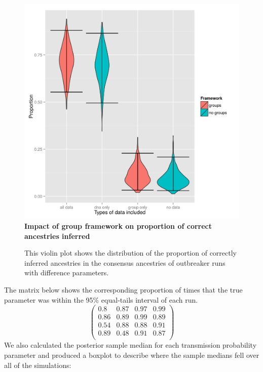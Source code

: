 \documentclass[11pt,a4paper]{report}
\begin{document}
\begin{figure}
\centering
\includegraphics[scale=0.6]{final.png}
\newline
{\bf Impact of group framework on proportion of correct ancestries inferred}
\caption{This violin plot shows the distribution of the proportion of correctly inferred ancestries in the consensus ancestries of outbreaker runs with difference parameters.}

\end{figure}
The matrix below shows the corresponding proportion of times that the true parameter was within the 95\% equal-tails interval of each run.
\[\begin{pmatrix}
0.8 & 0.87 & 0.97 & 0.99 \\
0.86 & 0.89 & 0.99 & 0.89 \\
0.54 & 0.88 & 0.88 & 0.91 \\
0.89 & 0.48 & 0.91 & 0.87 \\
\end{pmatrix}\]
We also calculated the posterior sample median for each transmission probability parameter and produced a boxplot to describe where the sample medians fell over all of the simulations:
\end{document}
